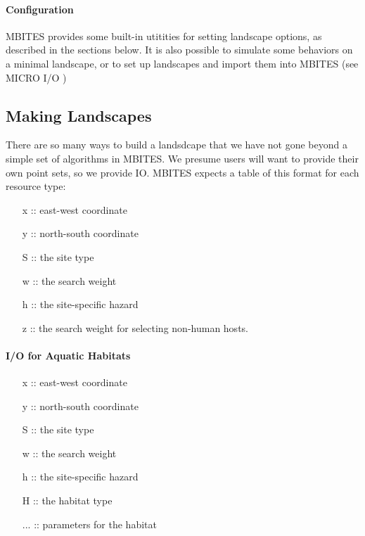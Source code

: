 \documentclass{article}
\begin{document}
\paragraph{Configuration}


MBITES provides some built-in utitities for setting landscape options, as described in the sections below. It is also possible to simulate some behaviors on a minimal landscape, or to set up landscapes and import them into MBITES (see MICRO I/O )

\subsection{Making Landscapes}

There are so many ways to build a landsdcape that we have not gone beyond a simple set of algorithms in MBITES. We presume users will want to provide their own point sets, so we provide IO. MBITES expects a table of this format for each resource type: 

\begin{itemize}
\item [x] :: east-west coordinate
\item [y] :: north-south coordinate
\item [S] :: the site type
\item [w] :: the search weight
\item [h] :: the site-specific hazard
\item [z] :: the search weight for selecting non-human hosts. 
\end{itemize} 

\paragraph{I/O for Aquatic Habitats}

\begin{itemize}
\item [x] :: east-west coordinate
\item [y] :: north-south coordinate
\item [S] :: the site type
\item [w] :: the search weight
\item [h] :: the site-specific hazard
\item [H] :: the habitat type
\item [...] :: parameters for the habitat 
\end{itemize} 
\end{document}
